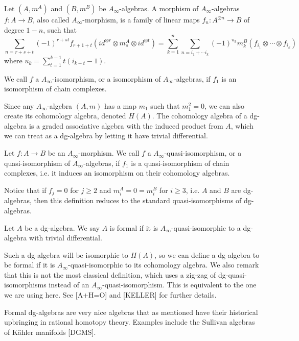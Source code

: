\begin{definition}
    Let $(A, m^A)$ and $(B, m^B)$ be $A_\infty$-algebras. A morphism of 
    $A_\infty$-algebras $f:A\longrightarrow B$, also called $A_\infty$-morphism, is a 
    family of linear maps $f_n:A^{\otimes n}\longrightarrow B$ of degree $1-n$, such that
    $$\sum_{n = r+s+t}(-1)^{r+st}f_{r+1+t}(id^{\otimes r}\otimes m_s^A \otimes id^{\otimes t}) = \sum_{k=1}^{n}\sum_{n=i_1+\cdots i_k}(-1)^{u_k} m_k^B(f_{i_1}\otimes \cdots \otimes f_{i_k})$$
    where $u_k=\displaystyle \sum_{t=1}^{k-1}t(i_{k-t}-1)$.     
\end{definition}

We call $f$ a $A_\infty$-isomorphism, or a isomorphism of $A_\infty$-algebras, if $f_1$ 
is an isomorphism of chain complexes.

Since any $A_\infty$-algebra $(A, m)$ has a map $m_1$ such that $m_1^2=0$, we can also 
create its cohomology algebra, denoted $H(A)$. The cohomology algebra of a dg-algebra 
is a graded associative algebra with the induced product from $A$, which we can treat as 
a dg-algebra by letting it have trivial differential.

Let $f:A\longrightarrow B$ be an $A_\infty$-morphism. We call $f$ a 
$A_\infty$-quasi-isomorphism, or a quasi-isomorphism of $A_\infty$-algebras, if $f_1$ is 
a quasi-isomorphism of chain complexes, i.e. it induces an isomorphism on their cohomology 
algebras.

Notice that if $f_j=0$ for $j\geq 2$ and $m^A_i = 0 = m^B_i$ for $i\geq 3$, i.e. $A$ and 
$B$ are dg-algebras, then this definition reduces to the standard quasi-isomorphisms of 
dg-algebras.

\begin{definition}
    Let $A$ be a dg-algebra. We say $A$ is formal if it is 
    $A_\infty$-quasi-isomorphic to a dg-algebra with trivial differential.        
\end{definition}

Such a dg-algebra will be isomorphic to $H(A)$, so we can define a dg-algebra to be 
formal if it is $A_\infty$-quasi-isomorphic to its cohomology algebra. We also remark 
that this is not the most classical definition, which uses a zig-zag of 
dg-quasi-isomorphisms instead of an $A_\infty$-quasi-isomorphism. This is equivalent 
to the one we are using here. See [A+H=O] and [KELLER] for further details. 

Formal dg-algebras are very nice algebras that as mentioned have their historical 
upbringing in rational homotopy theory. Examples include the Sullivan algebras of 
Kähler manifolds [DGMS].